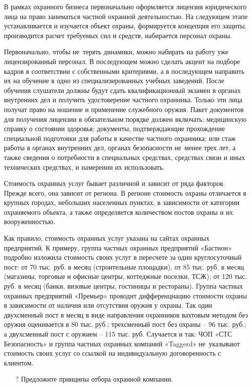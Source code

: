 \documentclass[a4paper,12pt,fleqn]{article} %
\begin{document}
В рамках охранного бизнеса первоначально оформляется лицензия юридического лица на право заниматься частной охранной деятельностью. На следующем этапе устанавливается и изучается объект охраны, формируется концепция его защиты, производится расчет требуемых сил и средств, набирается персонал охраны.

Первоначально, чтобы не~терять динамики, можно набирать на работу уже лицензированный персонал. В последующем можно сделать акцент на подборе кадров в соответствии с собственными критериями, а в последующем направить их на обучение в одно из специализированных учебных заведений. После обучения слушатели должны будут сдать квалификационный экзамен в органах внутренних дел и получить удостоверение частного охранника. Только эти лица получат право на ношение и применение служебного оружия. Пакет документов для получения лицензии в обязательном порядке должен включать: медицинскую справку о состоянии здоровья; документы, подтверждающие прохождение специальной подготовки для работы в качестве частного охранника; или стаж работы в органах внутренних дел, органах безопасности не~менее трех лет, а также сведения о потребности в специальных средствах, средствах связи и иных технических средствах, и намерении их использовать.

Стоимость охранных услуг бывает различной и зависит от ряда факторов. Прежде всего, она зависит от региона. В регионе стоимость охраны отличается в крупных городах, небольших населенных пунктах, в зависимости от категории охраняемого объекта, а также определяется количеством постов охраны и их вооруженностью.\\

\begin{tcolorbox}[colback=blue!55!red!5!,colframe=blue!55!red,enforce breakable,%
	pad at break=1mm, title=Кейс 32. Стоимость охранных услуг]
	
	Как правило, стоимость охранных услуг указана на сайтах охранных предприятий. К примеру, группа частных охранных предприятий «Бастион» подробно изложила стоимость своих услуг в пересчете за один круглосуточный пост: от 70 тыс. руб. в месяц (строительные площадки), от 85 тыс. руб. в месяц (магазины, торговые и офисные центры, коттеджные поселки, ТСЖ); от 120 тыс. руб. в месяц (банки, визовые центры, гостиницы и рестораны). Группа частных охранных предприятий «Премьер» проводит дифференциацию стоимости охраны в зависимости от наличия или отсутствия оружия у охраны. Так один двухсменный пост в месяц в виде направления охранников вахтовым методом без оружия оценивается в 80 тыс. руб.; трехсменный пост без охраны – 96 тыс. руб.; а двухсменный пост с оружием – 115 тыс. руб. Случается и так: ЧОП «СТС Безопасность» и группа частных охранных компаний «Taggerd» не~указывают стоимость своих услуг со ссылкой на индивидуальную договоренность с клиентом.	
	
	\begin{itemize}
		\item[{\color{blue!55!red}\Huge {  $ ? $}} \quad]   Предложите принципы отбора охранной компании.
	\end{itemize}	
	
\end{tcolorbox}
\end{document}
